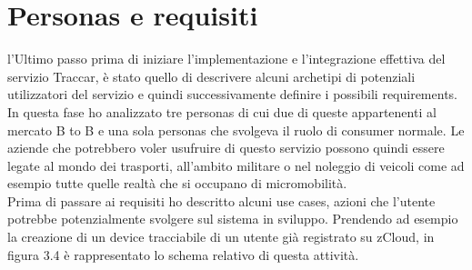 \documentclass[a4paper,titlepage,12pt]{report}
\begin{document}
{\section{
Personas e requisiti}
l'Ultimo passo prima di iniziare l'implementazione e l'integrazione effettiva del servizio Traccar, è stato quello di descrivere alcuni archetipi di potenziali utilizzatori del servizio e quindi successivamente definire i possibili requirements.\\
In questa fase ho analizzato tre personas di cui due di queste appartenenti al mercato B to B e una sola personas che svolgeva il ruolo di consumer normale. Le aziende che potrebbero voler usufruire di questo servizio possono quindi essere legate al mondo dei trasporti, all'ambito militare o nel noleggio di veicoli come ad esempio tutte quelle realtà che si occupano di micromobilità.\\
Prima di passare ai requisiti ho descritto alcuni use cases, azioni che l'utente potrebbe potenzialmente svolgere sul sistema in sviluppo. Prendendo ad esempio la creazione di un device tracciabile di un utente già registrato su zCloud, in figura 3.4 è rappresentato lo schema relativo di questa attività.

}
\end{document}
